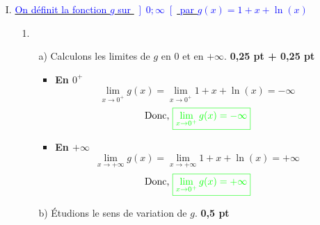 \documentclass[12pt]{article}
\begin{document}
\begin{itemize}
    \item[I.] \underline{\textcolor{blue}{On définit la fonction $g$ sur $\left]0 ; \infty\right[$ par $g(x) = 1 + x + \ln(x)$}}
    \begin{itemize}
        \item[1.] 
        \begin{itemize}
            \item[a)] Calculons les limites de $g$ en 0 et en $+\infty$. \textbf{0,25 pt + 0,25 pt}
            \begin{itemize}
            \item \textbf{En $0^{+}$}
            \[\lim_{x \to 0^{+}}g(x) = \lim_{x \to 0^{+}} 1 + x + \ln(x)=-\infty\]
            \[\text{Donc, }\color{green}{\boxed{\lim_{x \to 0^{+}}g(x)=-\infty}}\]
            \item \textbf{En $+\infty$}
            \[\lim_{x \to +\infty}g(x) = \lim_{x \to +\infty} 1 + x + \ln(x)=+\infty\]
            \[\text{Donc, }\color{green}{\boxed{\lim_{x \to 0^{+}}g(x)=+\infty}}\]
            \end{itemize}
            \item[b)] Étudions le sens de variation de $g$. \textbf{0,5 pt}
            

\end{itemize}
\end{itemize}
\end{itemize}
\end{document}

